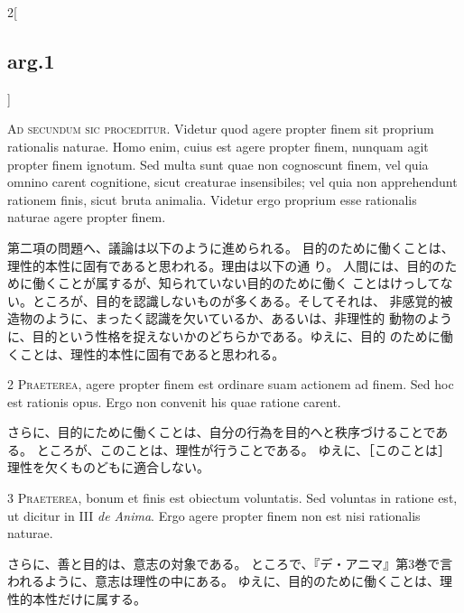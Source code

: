\documentclass[paper=a4paper,fontsize=10pt,jafontsize=9pt,titlepage]{jlreq}
\begin{document}
\begin{paracol}{2}[\subsection{arg.1}]

{\Huge A}{\scshape d secundum sic proceditur}. Videtur
quod agere propter finem sit proprium rationalis naturae. Homo enim,
cuius est agere propter finem, nunquam agit propter finem ignotum. Sed
multa sunt quae non cognoscunt finem, vel quia omnino carent cognitione,
sicut creaturae insensibiles; vel quia non apprehendunt rationem finis,
sicut bruta animalia. Videtur ergo proprium esse rationalis naturae
agere propter finem.

\switchcolumn

第二項の問題へ、議論は以下のように進められる。
目的のために働くことは、理性的本性に固有であると思われる。理由は以下の通
 り。
人間には、目的のために働くことが属するが、知られていない目的のために働く
 ことはけっしてない。ところが、目的を認識しないものが多くある。そしてそれは、
 非感覚的被造物のように、まったく認識を欠いているか、あるいは、非理性的
 動物のように、目的という性格を捉えないかのどちらかである。ゆえに、目的
 のために働くことは、理性的本性に固有であると思われる。


{\scshape 2 Praeterea}, agere propter finem est
ordinare suam actionem ad finem. Sed hoc est rationis opus. Ergo non
convenit his quae ratione carent.

\switchcolumn

さらに、目的にために働くことは、自分の行為を目的へと秩序づけることである。
ところが、このことは、理性が行うことである。
ゆえに、［このことは］理性を欠くものどもに適合しない。


{\scshape 3 Praeterea}, bonum et finis est obiectum
voluntatis. Sed voluntas in ratione est, ut dicitur in III {\itshape de
Anima}. Ergo agere propter finem non est nisi rationalis naturae.

\switchcolumn

さらに、善と目的は、意志の対象である。
ところで、『デ・アニマ』第3巻で言われるように、意志は理性の中にある。
ゆえに、目的のために働くことは、理性的本性だけに属する。


\end{paracol}
\end{document}

